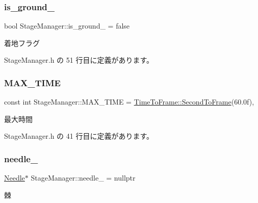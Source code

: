 \subsubsection{\texorpdfstring{is\+\_\+ground\+\_\+}{is\_ground\_}}
{\footnotesize\ttfamily bool Stage\+Manager\+::is\+\_\+ground\+\_\+ = false\hspace{0.3cm}{\ttfamily [private]}}



着地フラグ 



 Stage\+Manager.\+h の 51 行目に定義があります。

\mbox{\label{class_stage_manager_a46709c98366565c68f8de974385501a4}} 
\subsubsection{\texorpdfstring{M\+A\+X\+\_\+\+T\+I\+ME}{MAX\_TIME}}
{\footnotesize\ttfamily const int Stage\+Manager\+::\+M\+A\+X\+\_\+\+T\+I\+ME = \mbox{\hyperlink{class_time_to_frame_a02fe55cc63bdffd73d092d30cc7f0153}{Time\+To\+Frame\+::\+Second\+To\+Frame}}(60.\+0f)\hspace{0.3cm}{\ttfamily [static]}, {\ttfamily [private]}}



最大時間 



 Stage\+Manager.\+h の 41 行目に定義があります。

\mbox{\label{class_stage_manager_aaebf5b60351f6406ba9ca9bfaaaf8959}} 
\subsubsection{\texorpdfstring{needle\+\_\+}{needle\_}}
{\footnotesize\ttfamily \mbox{\hyperlink{class_needle}{Needle}}$\ast$ Stage\+Manager\+::needle\+\_\+ = nullptr\hspace{0.3cm}{\ttfamily [private]}}



棘 



